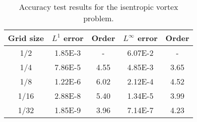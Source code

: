 \begin{table}[htbp!]
    \centering
    \caption{Accuracy test results for the isentropic vortex problem.} %
    \label{tab:ivResults}
    \setlength{\tabcolsep}{12.5pt} %
    \renewcommand{\arraystretch}{1.2}
    \begin{tabular}{ c c c c c}
        \toprule
        Grid size & $L^1$ error & Order & $L^\infty$ error & Order \\
        \midrule
        1/2 &1.85E-3 & - & 6.07E-2 & -\\
        1/4 &7.86E-5 & 4.55 & 4.85E-3 & 3.65\\
        1/8 &1.22E-6 & 6.02 & 2.12E-4 & 4.52\\
        1/16 &2.88E-8 & 5.40 & 1.34E-5 & 3.99\\
        1/32 &1.85E-9 & 3.96 & 7.14E-7 & 4.23 \\
    \bottomrule
    \end{tabular}
\end{table}


